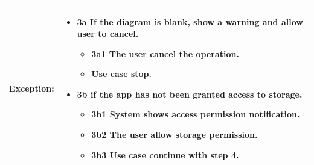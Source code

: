 \begin{table}[]
\begin{tabular}{| m{4cm} | m{11cm} |}
Exception: & \begin{itemize}
    \item {3a If the diagram is blank, show a warning and allow user to cancel.}
    \begin{itemize}
        \item 3a1 The user cancel the operation.
        \item Use case stop.
    \end{itemize}
    \item {3b if the app has not been granted access to storage.}
    \begin{itemize}
        \item 3b1 System shows access permission notification.
        \item 3b2 The user allow storage permission.
        \item 3b3 Use case continue with step 4.
    \end{itemize}
\end{itemize} \\ \hline
\end{tabular}
\end{table}

